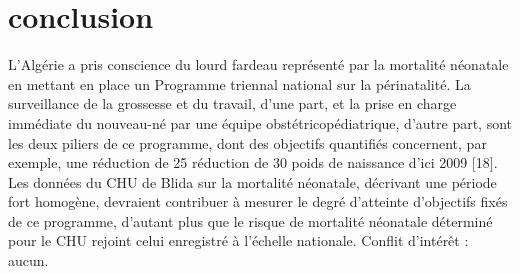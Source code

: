 
\section{conclusion}
L’Algérie a pris conscience du lourd fardeau représenté par la
mortalité néonatale en mettant en place un Programme
triennal national sur la périnatalité. La surveillance de la
grossesse et du travail, d’une part, et la prise en charge
immédiate du nouveau-né par une équipe obstétricopédiatrique,
d’autre part, sont les deux piliers de ce programme,
dont des objectifs quantifiés concernent, par exemple, une
réduction de 25 %
réduction de 30 %
poids de naissance d’ici 2009 [18].
Les données du CHU de Blida sur la mortalité néonatale,
décrivant une période fort homogène, devraient contribuer
à mesurer le degré d’atteinte d’objectifs fixés de ce
programme, d’autant plus que le risque de mortalité
néonatale déterminé pour le CHU rejoint celui enregistré à
l’échelle nationale.
Conflit d’intérêt : aucun.	